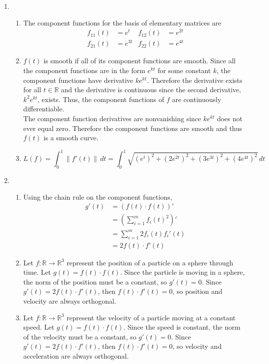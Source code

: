 \documentclass{report}
\begin{document}
\begin{enumerate}
	\item 
	\begin{enumerate}
		\item 
		The component functions for the basis of elementary matrices are 
		\begin{align*}
			f_{11}(t) &= e^t    & f_{12}(t) &= e^{2t} \\
			f_{21}(t) &= e^{3t} & f_{22}(t) &= e^{4t}
		\end{align*}

		\item 
		$f(t)$ is smooth if all of its component functions are smooth.
		Since all the component functions are in the form $e^{kt}$ for some constant $k$,
		the component functions have derivative $ke^{kt}$. 
		Therefore the derivative exists for all $t \in \mathbb{R}$
		and the derivative is continuous since the second derivative, $k^2e^{kt}$, exists.
		Thus, the component functions of $f$ are continuously differentiable. \\

		The component function derivatives are nonvanishing since 
		$ke^{kt}$ does not ever equal zero. 
		Therefore the component functions are smooth and thus $f(t)$ is a smooth curve.

		\item 
		\[
			L(f) 
			= \int_0^1 \|f'(t)\| \,dt
			= \int_0^1 \sqrt{(e^t)^2 + (2e^{2t})^2 + (3e^{3t})^2 + (4e^{4t})^2} \,dt
		\]
	\end{enumerate}

	\item 
	\begin{enumerate}
		\item 
		Using the chain rule on the component functions, 
		\begin{align*}
			g'(t)
			&= (f(t) \cdot f(t))' \\
			&= (\sum_{i=1}^m f_i(t)^2)' \\
			&= \sum_{i=1}^m 2f_i(t) f_i'(t)\\
			&= 2f(t) \cdot f'(t) 
		\end{align*}

		\item 
		Let $f: \mathbb{R} \rightarrow \mathbb{R}^3$ 
		represent the position of a particle on a sphere through time.
		Let $g(t) = f(t) \cdot f(t)$.
		Since the particle is moving in a sphere, 
		the norm of the position must be a constant,
		so  $g'(t) = 0$.
		Since $g'(t) = 2f(t) \cdot f'(t)$,
		then $f(t) \cdot f'(t) = 0$, so position and velocity are always orthogonal.

		\item 
		Let $f: \mathbb{R} \rightarrow \mathbb{R}^3$ 
		represent the velocity of a particle moving at a constant speed.
		Let $g(t) = f(t) \cdot f(t)$.
		Since the speed is constant,
		the norm of the velocity must be a constant,
		so $g'(t) = 0$.
		Since $g'(t) = 2f(t) \cdot f'(t)$,
		then $f(t) \cdot f'(t) = 0$, so velocity and acceleration are always orthogonal.
		 
	\end{enumerate}
\end{enumerate}
\end{document}
